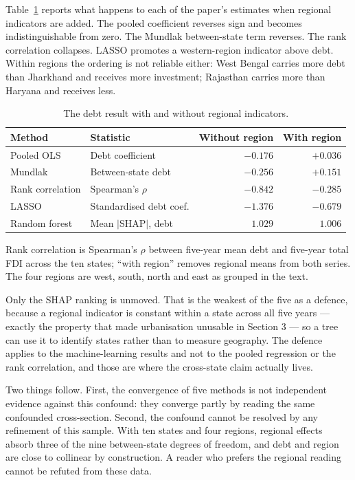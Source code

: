 \documentclass[12pt]{article}
\newcommand{\tnote}[1]{%
  \par\addvspace{4pt}%
  \begin{minipage}{0.92\textwidth}\footnotesize\raggedright #1\end{minipage}}
\begin{document}
Table~\ref{tab:region} reports what happens to each of the paper's estimates when
regional indicators are added. The pooled coefficient reverses sign and becomes
indistinguishable from zero. The Mundlak between-state term reverses. The rank
correlation collapses. LASSO promotes a western-region indicator above debt.
Within regions the ordering is not reliable either: West Bengal carries more debt
than Jharkhand and receives more investment; Rajasthan carries more than Haryana
and receives less.

\begin{table}[H]
\centering
\caption{The debt result with and without regional indicators.}
\label{tab:region}
\small
\begin{tabular}{@{}llrr@{}}
\toprule
Method & Statistic & Without region & With region \\
\midrule
Pooled OLS        & Debt coefficient       & $-0.176$ & $+0.036$ \\
Mundlak           & Between-state debt     & $-0.256$ & $+0.151$ \\
Rank correlation  & Spearman's $\rho$      & $-0.842$ & $-0.285$ \\
LASSO             & Standardised debt coef.& $-1.376$ & $-0.679$ \\
Random forest     & Mean $|$SHAP$|$, debt  & $1.029$  & $1.006$ \\
\bottomrule
\end{tabular}
\tnote{Rank correlation is Spearman's $\rho$ between five-year mean debt and
five-year total FDI across the ten states; ``with region'' removes regional means
from both series. The four regions are west, south, north and east as grouped in
the text.}
\end{table}

Only the SHAP ranking is unmoved. That is the weakest of the five as a defence,
because a regional indicator is constant within a state across all five years ---
exactly the property that made urbanisation unusable in Section 3 --- so a tree
can use it to identify states rather than to measure geography. The defence
applies to the machine-learning results and not to the pooled regression or the
rank correlation, and those are where the cross-state claim actually lives.

Two things follow. First, the convergence of five methods is not independent
evidence against this confound: they converge partly by reading the same
confounded cross-section. Second, the confound cannot be resolved by any
refinement of this sample. With ten states and four regions, regional effects
absorb three of the nine between-state degrees of freedom, and debt and region
are close to collinear by construction. A reader who prefers the regional reading
cannot be refuted from these data.
\end{document}
